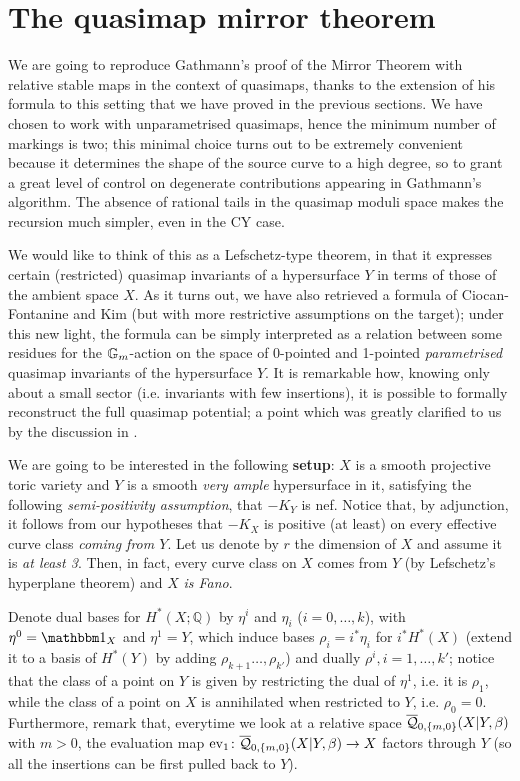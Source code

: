 \section{The quasimap mirror theorem} \label{Section quasimap mirror theorem}

We are going to reproduce Gathmann's proof of the Mirror Theorem with relative stable maps \cite{Ga-MF} in the context of quasimaps, thanks to the extension of his formula to this setting that we have proved in the previous sections. We have chosen to work with unparametrised quasimaps, hence the minimum number of markings is two; this minimal choice turns out to be extremely convenient because it determines the shape of the source curve to a high degree, so to grant a great level of control on degenerate contributions appearing in Gathmann's algorithm. The absence of rational tails in the quasimap moduli space makes the recursion much simpler, even in the CY case.

We would like to think of this as a Lefschetz-type theorem, in that it expresses certain (restricted) quasimap invariants of a hypersurface $Y$ in terms of those of the ambient space $X$. As it turns out, we have also retrieved a formula of Ciocan-Fontanine and Kim \cite[Corollary 5.5.1]{CF-K-wallcrossing} (but with more restrictive assumptions on the target); under this new light, the formula can be simply interpreted as a relation between some residues for the $\mathbb{G}_m$-action on the space of 0-pointed and 1-pointed \emph{parametrised} quasimap invariants of the hypersurface $Y$. It is remarkable how, knowing only about a small sector (i.e. invariants with few insertions), it is possible to formally reconstruct the full quasimap potential; a point which was greatly clarified to us by the discussion in \cite[Section 5.5]{CF-K-wallcrossing}.

We are going to be interested in the following \textbf{setup}: $X$ is a smooth projective toric variety and $Y$ is a smooth \emph{very ample} hypersurface in it, satisfying the following \emph{semi-positivity assumption}, that $-K_Y$ is nef. Notice that, by adjunction, it follows from our hypotheses that $-K_X$ is positive (at least) on every effective curve class \emph{coming from $Y$}. Let us denote by $r$ the dimension of $X$ and assume it is \emph{at least 3}. Then, in fact, every curve class on $X$ comes from $Y$ (by Lefschetz's hyperplane theorem) and $X$ \emph{is Fano}.

Denote dual bases for $H^*(X;\mathbb Q)$ by $\eta^i$ and $\eta_i$ ($i=0,\ldots,k$), with $\eta^0=\mathbbm 1_X$ and $\eta^1=Y$, which induce bases $\rho_i=i^*\eta_i$ for $i^*H^*(X)$ (extend it to a basis of $H^*(Y)$ by adding $\rho_{k+1}\ldots,\rho_{k'}$) and dually $\rho^i, i=1,\ldots,k'$; notice that the class of a point on $Y$ is given by restricting the dual of $\eta^1$, i.e. it is $\rho_1$, while the class of a point on $X$ is annihilated when restricted to $Y$, i.e. $\rho_0=0$. Furthermore, remark that, everytime we look at a relative space $\overline{\mathcal Q}_{0,\{m,0\}}(X|Y,\beta)$ with $m>0$, the evaluation map $\operatorname{ev}_1\colon \overline{\mathcal Q}_{0,\{m,0\}}(X|Y,\beta)\rightarrow X$ factors through $Y$ (so all the insertions can be first pulled back to $Y$).


